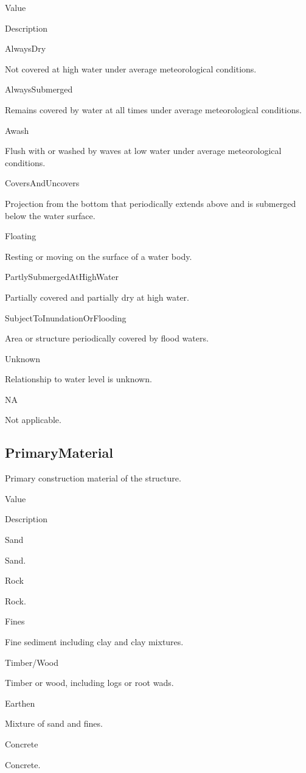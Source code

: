 \documentclass[
  letterpaper,
  DIV=11,
  numbers=noendperiod]{scrreprt}
\begin{document}
Value

Description

AlwaysDry

Not covered at high water under average meteorological conditions.

AlwaysSubmerged

Remains covered by water at all times under average meteorological
conditions.

Awash

Flush with or washed by waves at low water under average meteorological
conditions.

CoversAndUncovers

Projection from the bottom that periodically extends above and is
submerged below the water surface.

Floating

Resting or moving on the surface of a water body.

PartlySubmergedAtHighWater

Partially covered and partially dry at high water.

SubjectToInundationOrFlooding

Area or structure periodically covered by flood waters.

Unknown

Relationship to water level is unknown.

NA

Not applicable.

\subsection{PrimaryMaterial}\label{primarymaterial-2}

Primary construction material of the structure.

Value

Description

Sand

Sand.

Rock

Rock.

Fines

Fine sediment including clay and clay mixtures.

Timber/Wood

Timber or wood, including logs or root wads.

Earthen

Mixture of sand and fines.

Concrete

Concrete.
\end{document}
